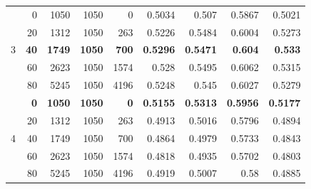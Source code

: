 \documentclass[a4paper]{llncs}
\begin{document}
\begin{table}[htbp!]
{\begin{tabular}{crrrrrrrr}
\multirow{5}{*}{3}                & 0           & 1050          & 1050          & 0            & 0.5034          & 0.507           & 0.5867          & 0.5021          \\
                                  & 20          & 1312          & 1050          & 263          & 0.5226          & 0.5484          & 0.6004          & 0.5273          \\
                                  & \textbf{40} & \textbf{1749} & \textbf{1050} & \textbf{700} & \textbf{0.5296} & \textbf{0.5471} & \textbf{0.604}  & \textbf{0.533}  \\
                                  & 60          & 2623          & 1050          & 1574         & 0.528           & 0.5495          & 0.6062          & 0.5315          \\
                                  & 80          & 5245          & 1050          & 4196         & 0.5248          & 0.545           & 0.6027          & 0.5279          \\ \hline
\multirow{5}{*}{4}                & \textbf{0}  & \textbf{1050} & \textbf{1050} & \textbf{0}   & \textbf{0.5155} & \textbf{0.5313} & \textbf{0.5956} & \textbf{0.5177} \\
                                  & 20          & 1312          & 1050          & 263          & 0.4913          & 0.5016          & 0.5796          & 0.4894          \\
                                  & 40          & 1749          & 1050          & 700          & 0.4864          & 0.4979          & 0.5733          & 0.4843          \\
                                  & 60          & 2623          & 1050          & 1574         & 0.4818          & 0.4935          & 0.5702          & 0.4803          \\
                                  & 80          & 5245          & 1050          & 4196         & 0.4919          & 0.5007          & 0.58            & 0.4885          \\ \hline
\end{tabular}%
}
\end{table}
\end{document}
